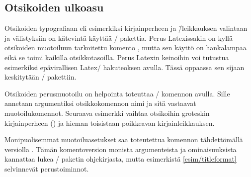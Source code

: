 \subsection{Otsikoiden ulkoasu}
\label{luku/otsikot-ulkoasu}

Otsikoiden typografiaan eli esimerkiksi kirjainperheen ja \=/leikkauksen
valintaan ja välistyksiin on kätevintä käyttää \-/
pakettia. Perus Latexissakin on kyllä otsikoiden muotoiluun tarkoitettu
komento , mutta sen käyttö on hankalampaa eikä
se toimi kaikilla otsikkotasoilla. Perus Latexin keinoihin voi tutustua
esimerkiksi epävirallisen Latex\-/ hakuteoksen \textcite{unoffref}
avulla. Tässä oppaassa sen sijaan keskitytään \-/
pakettiin.

Otsikoiden perusmuotoilu on helpointa toteuttaa
\-/ komennon avulla. Sille annetaan argumentiksi
otsikkokomennon nimi ja sitä vastaavat muotoilukomennot. Seuraava
esimerkki vaihtaa otsikoihin groteskin kirjainperheen
() ja hieman toisistaan poikkeavan kirjainleikkauksen.

\begin{koodilohkosis}
\titleformat*{\section}      {\sffamily\bfseries\Large}
\titleformat*{\subsection}   {\sffamily\bfseries\itshape\large}
\titleformat*{\subsubsection}{\sffamily\bfseries\normalsize}
\end{koodilohkosis}

\noindent
Monipuolisemmat muotoiluasetukset saa toteutettua komennon tähdettömällä
versiolla . Tämän komentoversion monista
argumenteista ja ominaisuuksista kannattaa lukea \-/
paketin ohjekirjasta, mutta esimerkistä \ref{esim/titleformat}
selvinnevät perustoiminnot.

